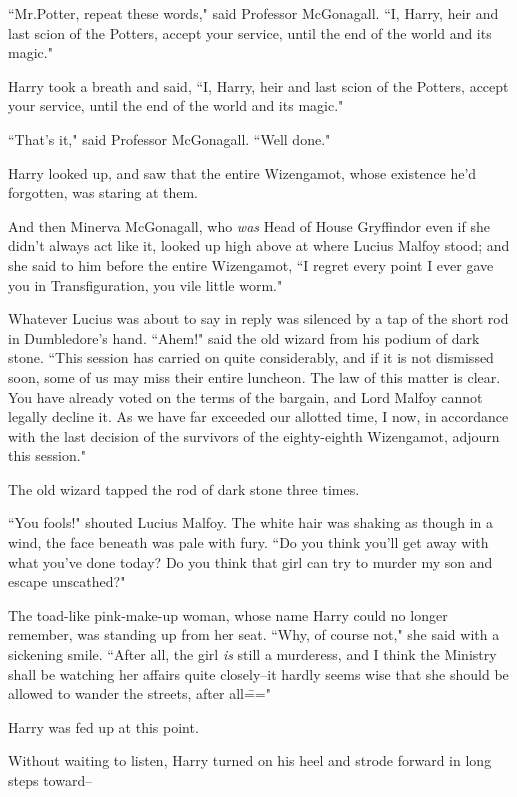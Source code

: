 ``Mr.\?Potter, repeat these words," said Professor McGonagall. ``I, Harry, heir and last scion of the Potters, accept your service, until the end of the world and its magic."

Harry took a breath and said, ``I, Harry, heir and last scion of the Potters, accept your service, until the end of the world and its magic."

``That's it," said Professor McGonagall. ``Well done."

Harry looked up, and saw that the entire Wizengamot, whose existence he'd forgotten, was staring at them.

And then Minerva McGonagall, who \emph{was} Head of House Gryffindor even if she didn't always act like it, looked up high above at where Lucius Malfoy stood; and she said to him before the entire Wizengamot, ``I regret every point I ever gave you in Transfiguration, you vile little worm."

Whatever Lucius was about to say in reply was silenced by a tap of the short rod in Dumbledore's hand. ``Ahem!" said the old wizard from his podium of dark stone. ``This session has carried on quite considerably, and if it is not dismissed soon, some of us may miss their entire luncheon. The law of this matter is clear. You have already voted on the terms of the bargain, and Lord Malfoy cannot legally decline it. As we have far exceeded our allotted time, I now, in accordance with the last decision of the survivors of the eighty-eighth Wizengamot, adjourn this session."

The old wizard tapped the rod of dark stone three times.

``You fools!" shouted Lucius Malfoy. The white hair was shaking as though in a wind, the face beneath was pale with fury. ``Do you think you'll get away with what you've done today? Do you think that girl can try to murder my son and escape unscathed?"

The toad-like pink-make-up woman, whose name Harry could no longer remember, was standing up from her seat. ``Why, of course not," she said with a sickening smile. ``After all, the girl \emph{is} still a murderess, and I think the Ministry shall be watching her affairs quite closely\---it hardly seems wise that she should be allowed to wander the streets, after all\==="

Harry was fed up at this point.

Without waiting to listen, Harry turned on his heel and strode forward in long steps toward\---


